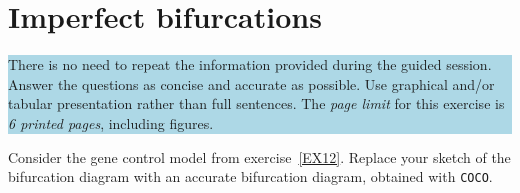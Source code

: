 \chapter{Imperfect bifurcations}

\begin{center}
\colorbox{LightBlue}{\parbox{1\textwidth}{ There is no need to repeat the information provided during the guided session. Answer the questions as concise and accurate as possible. Use graphical and/or tabular presentation rather than full sentences. The \textit{page limit} 
for this exercise is \textit{6 printed pages}, including figures.}}
\end{center}

\begin{Exercise}[name=Gene control revisited]\label{EX21}

Consider the gene control model from exercise~\ref{EX12}. 
\Question
Replace your sketch of the bifurcation diagram with an accurate bifurcation diagram, obtained with \texttt{COCO}.

\end{Exercise}

